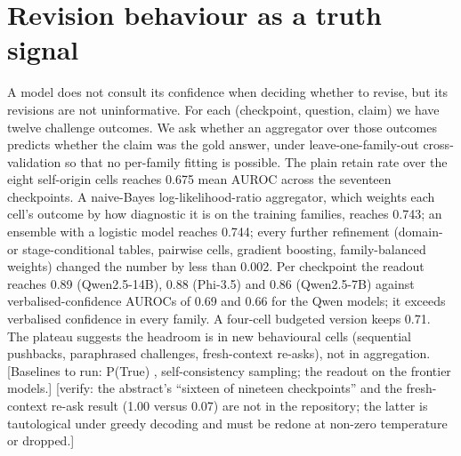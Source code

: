 \documentclass{article}
\newcommand{\pending}[1]{\textcolor{blue!70!black}{[#1]}}
\newcommand{\verify}[1]{\textcolor{red!75!black}{[verify: #1]}}
\begin{document}
\section{Revision behaviour as a truth signal}\label{sec:readout}
A model does not consult its confidence when deciding whether to revise, but its revisions are not uninformative. For each (checkpoint, question, claim) we have twelve challenge outcomes. We ask whether an aggregator over those outcomes predicts whether the claim was the gold answer, under leave-one-family-out cross-validation so that no per-family fitting is possible. The plain retain rate over the eight self-origin cells reaches 0.675 mean AUROC across the seventeen checkpoints. A naive-Bayes log-likelihood-ratio aggregator, which weights each cell's outcome by how diagnostic it is on the training families, reaches 0.743; an ensemble with a logistic model reaches 0.744; every further refinement (domain- or stage-conditional tables, pairwise cells, gradient boosting, family-balanced weights) changed the number by less than 0.002. Per checkpoint the readout reaches 0.89 (Qwen2.5-14B), 0.88 (Phi-3.5) and 0.86 (Qwen2.5-7B) against verbalised-confidence AUROCs of 0.69 and 0.66 for the Qwen models; it exceeds verbalised confidence in every family. A four-cell budgeted version keeps 0.71. The plateau suggests the headroom is in new behavioural cells (sequential pushbacks, paraphrased challenges, fresh-context re-asks), not in aggregation. \pending{Baselines to run: P(True) \citep{kadavath2022language}, self-consistency sampling; the readout on the frontier models.} \verify{the abstract's ``sixteen of nineteen checkpoints'' and the fresh-context re-ask result (1.00 versus 0.07) are not in the repository; the latter is tautological under greedy decoding and must be redone at non-zero temperature or dropped.}
\end{document}
